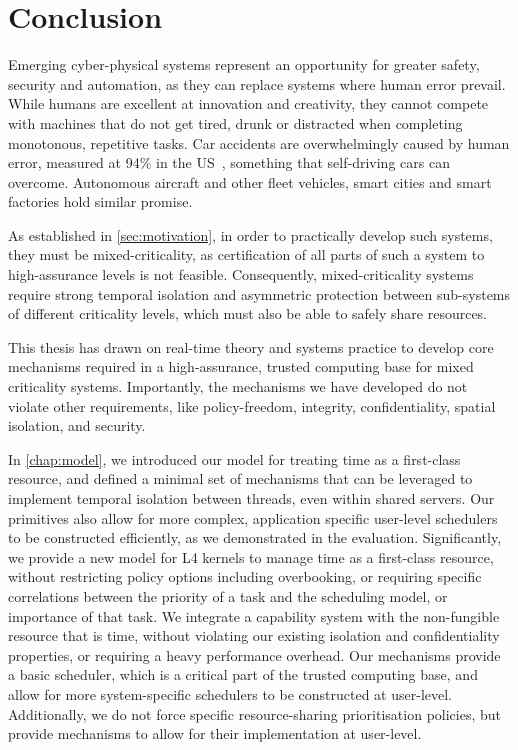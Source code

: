 \chapter{Conclusion}
\label{chap:conclusion}

Emerging cyber-physical systems represent an opportunity for greater safety, security and 
automation, as they can replace systems where human error prevail. While humans are excellent at
innovation and creativity, they cannot compete with machines that do not get tired, drunk or
distracted when completing
monotonous, repetitive tasks. Car accidents are overwhelmingly 
caused by human error, measured at 94\% in the US~\citep{Singh_15}, something that self-driving cars can overcome. Autonomous aircraft and other fleet vehicles, smart cities and smart factories hold similar promise. 

As established in \cref{sec:motivation}, in order to practically develop such systems,
they must be mixed-criticality, as certification of all parts of such a system to high-assurance
levels is not feasible. Consequently, mixed-criticality systems require strong temporal isolation
and asymmetric protection between sub-systems of different criticality levels, 
which must also be able to safely share resources.

This thesis has drawn on real-time theory and systems practice to develop core mechanisms required
in a high-assurance, trusted computing base for mixed criticality systems. Importantly, the
mechanisms we have developed do not violate other requirements, like policy-freedom, integrity,
confidentiality, spatial isolation, and security. 

In \cref{chap:model}, we introduced our model for treating time as a first-class resource, and 
defined a minimal set of
mechanisms that can be leveraged to implement temporal isolation between threads, even within shared
servers. Our primitives also allow for more complex, application specific user-level schedulers to
be constructed efficiently, as we demonstrated in the evaluation. Significantly, we provide a
new model for L4 kernels to manage time as a first-class resource, without restricting policy
options including overbooking, 
or requiring specific correlations between the priority of a task and the scheduling model, or
importance of that task. 
We integrate a capability system with the non-fungible resource that is time, without violating our
existing isolation and confidentiality properties, or requiring a heavy performance overhead.
Our mechanisms provide a basic scheduler, which is a critical part of the
trusted computing base, and allow for more system-specific schedulers to be constructed at
user-level. Additionally, we do not force specific
resource-sharing prioritisation policies, but provide mechanisms to allow for their implementation at user-level. 
\clearpage

